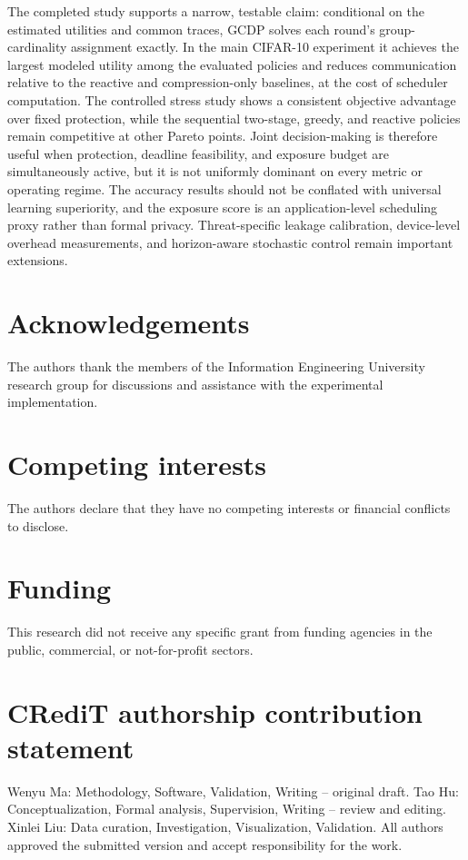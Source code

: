 \documentclass[preprint,12pt]{elsarticle}
\begin{document}
The completed study supports a narrow, testable claim: conditional on the estimated utilities and common traces, GCDP solves each round's group-cardinality assignment exactly. In the main CIFAR-10 experiment it achieves the largest modeled utility among the evaluated policies and reduces communication relative to the reactive and compression-only baselines, at the cost of scheduler computation. The controlled stress study shows a consistent objective advantage over fixed protection, while the sequential two-stage, greedy, and reactive policies remain competitive at other Pareto points. Joint decision-making is therefore useful when protection, deadline feasibility, and exposure budget are simultaneously active, but it is not uniformly dominant on every metric or operating regime. The accuracy results should not be conflated with universal learning superiority, and the exposure score is an application-level scheduling proxy rather than formal privacy. Threat-specific leakage calibration, device-level overhead measurements, and horizon-aware stochastic control remain important extensions.

\fontsize{8.5pt}{10pt}\selectfont
\section*{Acknowledgements}
The authors thank the members of the Information Engineering University research group for discussions and assistance with the experimental implementation.

\section*{Competing interests}
The authors declare that they have no competing interests or financial conflicts to disclose.

\section*{Funding}
This research did not receive any specific grant from funding agencies in the public, commercial, or not-for-profit sectors.

\section*{CRediT authorship contribution statement}
Wenyu Ma: Methodology, Software, Validation, Writing -- original draft. Tao Hu: Conceptualization, Formal analysis, Supervision, Writing -- review and editing. Xinlei Liu: Data curation, Investigation, Visualization, Validation. All authors approved the submitted version and accept responsibility for the work.
\end{document}
